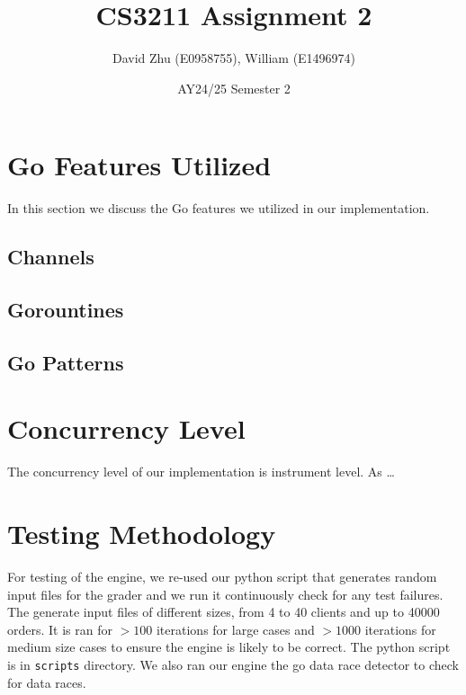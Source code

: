 \documentclass[11pt]{article}
\title{CS3211 Assignment 2}
\author{David Zhu (E0958755), William (E1496974)}
\date{AY24/25 Semester 2}
\begin{document}
\maketitle

\section{Go Features Utilized}

In this section we discuss the Go features we utilized in our implementation.

\subsection{Channels}

\subsection{Gorountines}

\subsection{Go Patterns}

\section{Concurrency Level}

The concurrency level of our implementation is instrument level. As \dots


\section{Testing Methodology}

For testing of the engine, we re-used our python script that generates random input files for the grader and we run it
continuously check for any test failures. The generate input files of different sizes, from 4 to 40
clients and up to 40000 orders. It is ran for $> 100$ iterations for large cases and $> 1000$
iterations for medium size cases to ensure the engine is likely to be correct.
The python script is in \texttt{scripts} directory. We
also ran our engine the go data race detector to check for data races.

\end{document}
